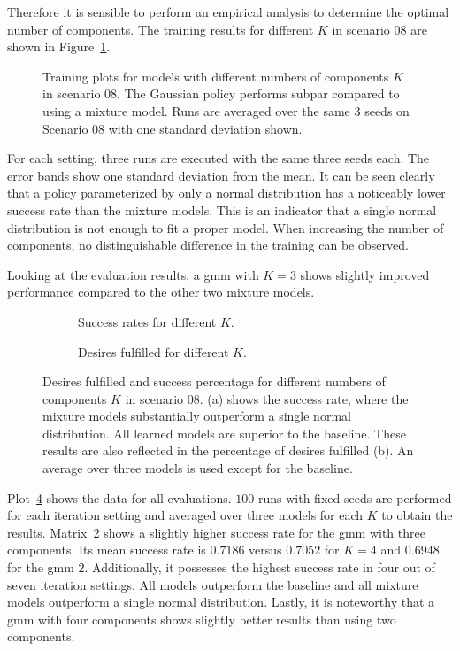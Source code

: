 Therefore it is sensible to perform an empirical analysis to determine the optimal number of components. The training results for different $K$ in scenario 08 are shown in Figure~\ref{fig:component_trainings}. 
\begin{figure}[h]
	\centering
	\captionsetup{justification=centering}
	\scalebox{0.9}{
    
    }
	\caption[Training for different numbers of components]{Training plots for models with different numbers of components $K$ in scenario 08. The Gaussian policy performs subpar compared to using a mixture model. Runs are averaged over the same $3$ seeds on Scenario 08 with one standard deviation shown.}
\label{fig:component_trainings}
\end{figure}
For each setting, three runs are executed with the same three seeds each. The error bands show one standard deviation from the mean. It can be seen clearly that a policy parameterized by only a normal distribution has a noticeably lower success rate than the mixture models. This is an indicator that a single normal distribution is not enough to fit a proper model. When increasing the number of components, no distinguishable difference in the training can be observed.

Looking at the evaluation results, a \gls{gmm} with $K=3$ shows slightly improved performance compared to the other two mixture models.
\begin{figure}
\begin{subfigure}{.5\textwidth}
  \centering
  \scalebox{0.5}{
  
  }
  \caption{Success rates for different $K$.}
  \label{fig:comp_success_matrix}
\end{subfigure}
\begin{subfigure}{.5\textwidth}
  \centering
  \scalebox{0.5}{
  
  }
  \caption{Desires fulfilled for different $K$.}
  \label{fig:comp_desire_matrix}
\end{subfigure}
\caption[Evaluation for different numbers of components]{Desires fulfilled and success percentage for different numbers of components $K$ in scenario 08. (a) shows the success rate, where the mixture models substantially outperform a single normal distribution. All learned models are superior to the baseline. These results are also reflected in the percentage of desires fulfilled (b). An average over three models is used except for the baseline.}
\label{fig:comp_matrix_plots}
\end{figure}Plot~\ref{fig:comp_matrix_plots} shows the data for all evaluations. $100$ runs with fixed seeds are performed for each iteration setting and averaged over three models for each $K$ to obtain the results.
Matrix~\ref{fig:comp_success_matrix} shows a slightly higher success rate for the \gls{gmm} with three components. Its mean success rate is $0.7186$ versus $0.7052$ for $K=4$ and $0.6948$ for the \gls{gmm} $2$. Additionally, it possesses the highest success rate in four out of seven iteration settings. All models outperform the baseline and all mixture models outperform a single normal distribution. Lastly, it is noteworthy that a \gls{gmm} with four components shows slightly better results than using two components.

